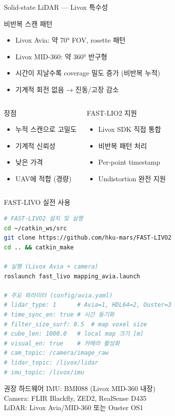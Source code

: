 \begin{frame}{Solid-state LiDAR — Livox 특수성}
  \begin{block}{비반복 스캔 패턴}
    \begin{itemize}
      \item Livox Avia: 약 70° FOV, rosette 패턴
      \item Livox MID-360: 약 360° 반구형
      \item 시간이 지날수록 coverage 밀도 증가 (비반복 누적)
      \item 기계적 회전 없음 → 진동/고장 감소
    \end{itemize}
  \end{block}
  \pause
  \begin{columns}
    \begin{block}{장점}
      \begin{itemize}
        \item 누적 스캔으로 고밀도
        \item 기계적 신뢰성
        \item 낮은 가격
        \item UAV에 적합 (경량)
      \end{itemize}
    \end{block}
    \begin{block}{FAST-LIO2 지원}
      \begin{itemize}
        \item Livox SDK 직접 통합
        \item 비반복 패턴 처리
        \item Per-point timestamp
        \item Undistortion 완전 지원
      \end{itemize}
    \end{block}
  \end{columns}
\end{frame}

\begin{frame}[fragile]{FAST-LIVO 실전 사용}
\begin{lstlisting}[language=bash]
# FAST-LIVO2 설치 및 실행
cd ~/catkin_ws/src
git clone https://github.com/hku-mars/FAST-LIVO2
cd .. && catkin_make

# 실행 (Livox Avia + camera)
roslaunch fast_livo mapping_avia.launch

# 주요 파라미터 (config/avia.yaml)
# lidar_type: 1      # Avia=1, HDL64=2, Ouster=3
# time_sync_en: true # 시간 동기화
# filter_size_surf: 0.5  # map voxel size
# cube_len: 1000.0   # local map 크기 [m]
# visual_en: true    # 카메라 활성화
# cam_topic: /camera/image_raw
# lidar_topic: /livox/lidar
# imu_topic: /livox/imu
\end{lstlisting}
  \begin{exampleblock}{권장 하드웨어}
    IMU: BMI088 (Livox MID-360 내장)\\
    Camera: FLIR Blackfly, ZED2, RealSense D435\\
    LiDAR: Livox Avia/MID-360 또는 Ouster OS1
  \end{exampleblock}
\end{frame}

